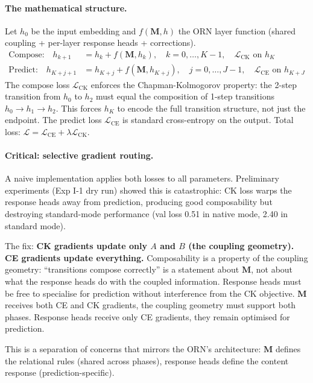 \documentclass[11pt, a4paper]{article}
\newcommand{\M}{\mathbf{M}}
\theoremstyle{plain}
\theoremstyle{definition}
\theoremstyle{remark}
\begin{document}
\paragraph{The mathematical structure.}
Let $h_0$ be the input embedding and $f(\M, h)$ the ORN layer function (shared coupling + per-layer response heads + corrections).
\begin{align}
\text{Compose:} \quad h_{k+1} &= h_k + f(\M, h_k), \quad k = 0, \ldots, K{-}1, \quad \mathcal{L}_{\text{CK}} \text{ on } h_K \label{eq:compose} \\
\text{Predict:} \quad h_{K+j+1} &= h_{K+j} + f(\M, h_{K+j}), \quad j = 0, \ldots, J{-}1, \quad \mathcal{L}_{\text{CE}} \text{ on } h_{K+J} \label{eq:predict}
\end{align}
The compose loss $\mathcal{L}_{\text{CK}}$ enforces the Chapman-Kolmogorov property: the 2-step transition from $h_0$ to $h_2$ must equal the composition of 1-step transitions $h_0 \to h_1 \to h_2$.
This forces $h_K$ to encode the full transition structure, not just the endpoint.
The predict loss $\mathcal{L}_{\text{CE}}$ is standard cross-entropy on the output.
Total loss: $\mathcal{L} = \mathcal{L}_{\text{CE}} + \lambda \mathcal{L}_{\text{CK}}$.

\paragraph{Critical: selective gradient routing.}
A naive implementation applies both losses to all parameters.
Preliminary experiments (Exp I-1 dry run) showed this is catastrophic: CK loss warps the response heads away from prediction, producing good composability but destroying standard-mode performance (val loss 0.51 in native mode, 2.40 in standard mode).

The fix: \textbf{CK gradients update only $A$ and $B$ (the coupling geometry).  CE gradients update everything.}
Composability is a property of the coupling geometry: ``transitions compose correctly'' is a statement about $\M$, not about what the response heads do with the coupled information.
Response heads must be free to specialise for prediction without interference from the CK objective.
$\M$ receives both CE and CK gradients, the coupling geometry must support both phases.
Response heads receive only CE gradients, they remain optimised for prediction.

This is a separation of concerns that mirrors the ORN's architecture: $\M$ defines the relational rules (shared across phases), response heads define the content response (prediction-specific).
\end{document}
